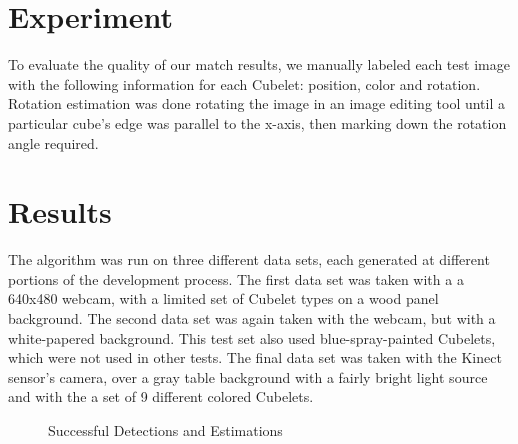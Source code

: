 \documentclass[conference]{IEEEtran}
\begin{document}
\section{Experiment}

To evaluate the quality of our match results, we manually labeled each test image with the following information for each Cubelet: position, color and rotation. Rotation estimation was done rotating the image in an image editing tool until a particular cube's edge was parallel to the x-axis, then marking down the rotation angle required.\\

\section{Results}
The algorithm was run on three different data sets, each generated at different portions of the development process.  The first data set was taken with a a 640x480 webcam, with a limited set of Cubelet types on a wood panel background.  The second data set was again taken with the webcam, but with a white-papered background.  This test set also used blue-spray-painted Cubelets, which were not used in other tests. The final data set was taken with the Kinect sensor's camera, over a gray table background with a fairly bright light source and with the a set of 9 different colored Cubelets.

\begin{figure}[!t]
\centerline{
\label{fig_first_case}
\hfil
{}}
\caption{Successful Detections and Estimations}
\label{fig_sim}
\end{figure}
\end{document}

